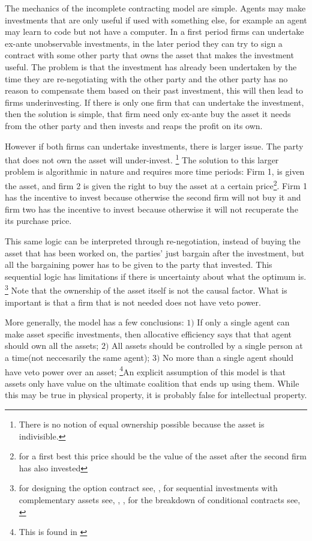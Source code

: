\documentclass[12pt]{article}
\numberwithin{equation}{section}
\begin{document}
The mechanics of the incomplete contracting model are simple. Agents may make investments that are only useful if used with something else, for example an agent may learn to code but not have a computer. In a first period firms can undertake ex-ante unobservable investments, in the later period they can try to sign a contract with some other party that owns the asset that makes the investment useful. The problem is that the investment has already been undertaken by the time they are re-negotiating with the other party and the other party has no reason to compensate them based on their past investment, this will then lead to firms underinvesting. If there is only one firm that can undertake the investment, then the solution is simple, that firm need only ex-ante buy the asset it needs from the other party and then invests and reaps the profit on its own.

However if both firms can undertake investments, there is larger issue. The party that does not own the asset will under-invest. \footnote{There is no notion of equal ownership possible because the asset is indivisible.}  The solution to this larger problem is algorithmic in nature and requires more time periods: Firm 1, is given the asset, and firm 2 is given the right to buy the asset at a certain price\footnote{for a first best this price should be the value of the asset after the second firm has also invested}. Firm 1 has the incentive to invest because otherwise the second firm will not buy it and firm two has the incentive to invest because otherwise it will not recuperate the its purchase price.

This same logic can be interpreted through re-negotiation, instead of buying the asset that has been worked on, the parties’ just bargain after the investment, but all the bargaining power has to be given to the party that invested. This sequential logic has limitations if there is uncertainty about what the optimum is. \footnote{for designing the option contract see, \cite{Noldeke1998}, for sequential investments with complementary assets see, \cite{Zhang2014},\cite{bessen_maskin} , for the breakdown of conditional contracts see, \cite{Maskin1999}} Note that the ownership of the asset itself is not the causal factor. What is important is that a firm that is not needed does not have veto power.

More generally, the model has a few conclusions: $1)$ If only a single agent can make asset specific investments, then allocative efficiency says that that agent should own all the assets; $2)$ All assets should be controlled by a single person at a time(not neccesarily the same agent); $3)$ No more than a single agent should have veto power over an asset; \footnote{This is found in \cite{Hart1990}}An explicit assumption of this model is that assets only have value on the ultimate coalition that ends up using them. While this may be true in physical property, it is probably false for intellectual property.
\end{document}
